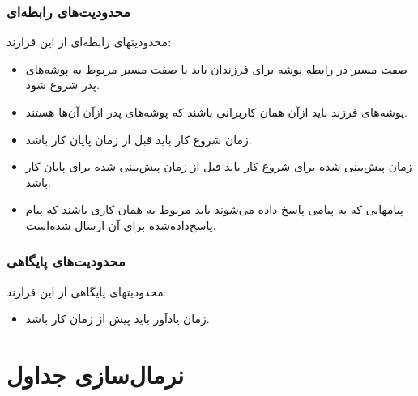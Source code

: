 \documentclass{article}
\begin{document}
\subsubsection*{محدودیت‌های رابطه‌ای}
محدودیتهای رابطه‌ای از این قرارند:
\begin{itemize}
\item
صفت مسیر
  در رابطه پوشه
    برای فرزندان باید با صفت مسیر مربوط به پوشه‌های پدر شروع شود. 
\item
پوشه‌های فرزند باید ازآن همان کاربرانی باشند که پوشه‌های پدر ازآن آن‌ها هستند. 
\item
زمان شروع کار
 باید قبل از زمان پایان کار باشد. 
\item
زمان پیش‌بینی شده برای شروع کار باید قبل از زمان پیش‌بینی شده برای پایان کار باشد. 
\item
پیامهایی که به پیامی پاسخ داده می‌شوند باید مربوط به همان کاری باشند که پیام پاسخ‌داده‌شده برای آن ارسال شده‌است. 
\end{itemize}
\subsubsection*{محدودیت‌های پایگاهی}
محدودیتهای پایگاهی از این قرارند:
\begin{itemize}
\item
زمان یادآور باید پیش از زمان کار باشد. 
\end{itemize}

\section*{نرمال‌سازی جداول}
\end{document}
